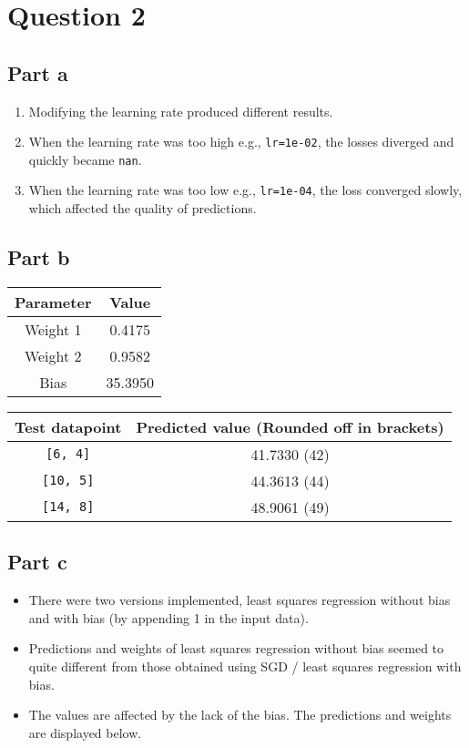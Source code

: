 \documentclass{article}
\begin{document}
\section*{Question 2}
\subsection*{Part a}
\begin{enumerate}
\item Modifying the learning rate produced different results.
\item When the learning rate was too high e.g., \texttt{lr=1e-02}, the losses diverged and quickly became \texttt{nan}.
\item When the learning rate was too low e.g., \texttt{lr=1e-04}, the loss converged slowly, which affected the quality of predictions.
\end{enumerate}

\subsection*{Part b}
\begin{center}
\begin{tabular}{|c|c|}
\hline
\textbf{Parameter} & \textbf{Value} \\
\hline
Weight 1 & 0.4175 \\
\hline
Weight 2 & 0.9582 \\
\hline
Bias & 35.3950 \\
\hline
\end{tabular}

\begin{tabular}{|c|c|}
\hline
\textbf{Test datapoint} & \textbf{Predicted value (Rounded off in brackets)}\\
\hline
\texttt{[6, 4]} & 41.7330 (42) \\
\hline
\texttt{[10, 5]} & 44.3613 (44) \\
\hline
\texttt{[14, 8]} & 48.9061 (49) \\
\hline
\end{tabular}
\end{center}

\subsection*{Part c}
\begin{itemize}
\item There were two versions implemented, least squares regression without bias and with bias (by appending 1 in the input data).
\item Predictions and weights of least squares regression without bias seemed to quite different from those obtained using SGD / least squares regression with bias.
\item The values are affected by the lack of the bias. The predictions and weights are displayed below.
\end{itemize}
\end{document}
